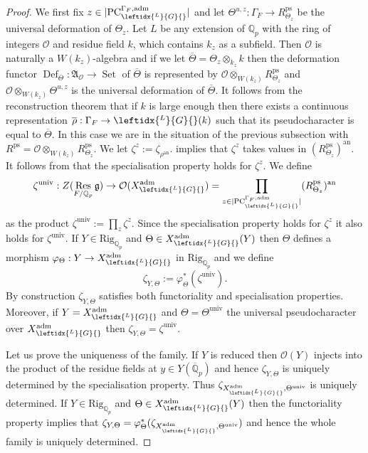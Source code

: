 \documentclass{amsart}
\theoremstyle{definition}
\theoremstyle{remark}
\DeclareMathOperator{\Res}{Res}
\DeclareMathOperator{\Def}{Def}
\DeclareMathOperator{\Set}{Set}
\newcommand{\Qp}{\mathbb {Q}_p}
\newcommand{\Qpbar}{\overline{\mathbb{Q}}_p}
\newcommand{\OO}{\mathcal O}
\newcommand{\ana}{\mathrm{an}}
\newcommand{\adm}{\mathrm{adm}}
\newcommand{\rhobar}{\overline{\rho}}
\newcommand{\univ}{\mathrm{univ}}
\newcommand{\PC}{\mathrm{PC}}
\newcommand{\Thetabar}{\overline{\Theta}}
\newcommand{\ps}{\mathrm{ps}}
\newcommand{\LG}{\leftidx{^L}{G}{}}
\newcommand{\Rig}{\mathrm{Rig}}
\begin{document}
\begin{proof} We first fix $z\in |\PC^{\Gamma_F,\adm}_{\LG}|$
and let $\Theta^{u,z}: \Gamma_F \rightarrow R^{\ps}_{\Theta_z}$ 
be the universal deformation of $\Theta_z$. 
Let 
$L$ be any extension of $\Qp$ with the ring of integers $\OO$ and residue field $k$, which contains $k_{z}$ as a subfield. 
Then $\OO$ is naturally a $W(k_z)$-algebra and if we let $\Thetabar= \Theta_z\otimes_{k_z} k$ then the deformation functor $\Def_{\Thetabar}: \mathfrak A_{\OO}\rightarrow \Set$
of $\Thetabar$ is represented by $\OO\otimes_{W(k_z)} R^{\ps}_{\Theta_z}$ and $\OO\otimes_{W(k_z)} \Theta^{u,z}$
is the universal deformation of $\Thetabar$.
It follows from the reconstruction theorem \cite[Theorem 3.8]{quast} that if $k$ is large enough 
then there exists a continuous representation 
$\rhobar: \Gamma_F\rightarrow \LG(k)$ such that its 
pseudocharacter is equal to $\Thetabar$. In this case we are 
in the situation of the previous subsection with $R^{\ps}=\OO\otimes_{W(k_z)} R^{\ps}_{\Theta_z}$. 
We let $\zeta^z:= \zeta_{\rho^{\ana}}$.  implies 
that $\zeta^z$ takes values in $(R^{\ps}_{\Theta_z})^{\ana}$. 
It follows from  that the specialisation property holds for $\zeta^z$. We define
$$\zeta^{\univ}: Z(\Res_{F/\Qp} \mathfrak g)\rightarrow \OO(X^{\adm}_{\LG})=\prod_{z\in |\PC^{\Gamma_F,\adm}_{\LG}|} (R^{\ps}_{\Theta_z})^{\ana}$$
as the product $\zeta^{\univ}:=\prod_z \zeta^z$. Since the specialisation 
property holds for $\zeta^z$ it also holds for $\zeta^{\univ}$. If $Y\in \Rig_{\Qp}$ and $\Theta\in X^{\adm}_{\LG}(Y)$ then $\Theta$ defines a morphism 
$\varphi_{\Theta}: Y\rightarrow X^{\adm}_{\LG}$ in $\Rig_{\Qp}$ and 
we define $$\zeta_{Y, \Theta}:= \varphi_{\Theta}^* (\zeta^{\univ}).$$ By construction $\zeta_{Y, \Theta}$
satisfies both functoriality and specialisation properties. 
Moreover, if $Y= X^{\adm}_{\LG}$ and $\Theta=\Theta^{\univ}$ the universal pseudocharacter over $X^{\adm}_{\LG}$ then 
$\zeta_{Y, \Theta}=\zeta^{\univ}$.

Let us prove the uniqueness of the family. If $Y$ is reduced
then $\OO(Y)$ injects into the product of the residue fields
at $y\in Y(\Qpbar)$ and hence $\zeta_{Y, \Theta}$ is 
uniquely determined by the specialisation property. Thus $\zeta_{X^{\adm}_{\LG}, \Theta^{\univ}}$ is
uniquely determined. If $Y\in \Rig_{\Qp}$ and 
$\Theta\in X^{\adm}_{\LG}(Y)$ then the functoriality property implies that $\zeta_{Y, \Theta}=\varphi_{\Theta}^*(\zeta_{X^{\adm}_{\LG}, \Theta^{\univ}})$ and hence the whole family is uniquely determined. 
\end{proof}
\end{document}
